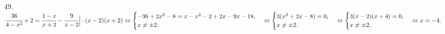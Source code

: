49. $\cfrac{36}{4-x^2}+2=\cfrac{1-x}{x+2}-\cfrac{9}{x-2}\Big|\cdot(x-2)(x+2)\Leftrightarrow\begin{cases}-36+2x^2-8=x-x^2-2+2x-9x-18,\\x\neq\pm2.\end{cases}
\Leftrightarrow\begin{cases}3(x^2+2x-8)=0,\\x\neq\pm2.\end{cases}\Leftrightarrow\begin{cases}3(x-2)(x+4)=0,\\x\neq\pm2.\end{cases}\Leftrightarrow x=-4.$\\
